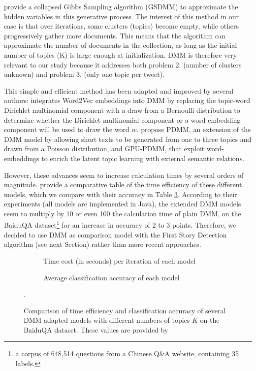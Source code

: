 \citet{yin_dirichlet_2014} provide a collapsed Gibbs Sampling algorithm (GSDMM) to approximate the hidden variables in this generative process. The interest of this method in our case is that over iterations, some clusters (topics) become empty, while others progressively gather more documents. This means that the algorithm can approximate the number of documents in the collection, as long as the initial number of topics (K) is large enough at initialization. DMM is therefore very relevant to our study because it addresses both problem 2. (number of clusters unknown) and problem 3. (only one topic per tweet).

This simple and efficient method has been adapted and improved by several authors:
\citet{nguyen2015improving} integrates Word2Vec embeddings into DMM by replacing the topic-word Dirichlet multinomial component with a draw from a Bernoulli distribution to determine whether the Dirichlet multinomial component or a word embedding component will be used to draw the word $w$. \citet{li_enhancing_2017} propose PDMM, an extension of the DMM model by allowing short texts to be generated from one to three topics and drawn from a Poisson distribution, and GPU-PDMM, that exploit word-embeddings to enrich the latent topic learning with external semantic relations. 

However, these advances seem to increase calculation times by several orders of magnitude. \citet{li_enhancing_2017} provide a comparative table of the time efficiency of these different models, which we compare with their accuracy in Table \ref{Tab: BenchmarkDMM}. According to their experiments (all models are implemented in Java), the extended DMM models seem to multiply by 10 or even 100 the calculation time of plain DMM, on the BaiduQA dataset\footnote{a corpus of 648,514 questions from a Chinese Q\&A website, containing 35 labels.} for an increase in accuracy of 2 to 3 points. Therefore, we decided to use DMM as comparison model with the First Story Detection algorithm (see next Section) rather than more recent approaches.


\begin{figure}[h]
\centering
\begin{subfigure}{.5\textwidth}
  \centering
  
  \caption{Time cost (in seconds) per iteration of each model}
  \label{Tab: time_efficiency}
\end{subfigure}%
\begin{subfigure}{.5\textwidth}
  \centering
  
  \caption{Average classification accuracy of each model}
  \label{Tab: classification_accuracy}
\end{subfigure}
\caption{Comparison of time efficiency and classification accuracy of several DMM-adapted models with different numbers of topics $K$ on the BaiduQA dataset. These values are provided by \citet{li_enhancing_2017}}.
\label{Tab: BenchmarkDMM}
\end{figure}
 	 



